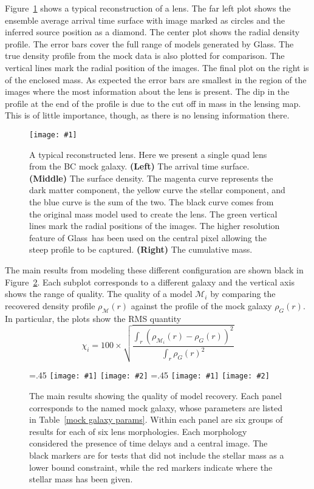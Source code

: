\documentclass[onecolumn,galley]{mn2e}
\newcommand{\Glass}{{\sc Glass}}
\newcommand{\M}{\ensuremath{\mathscr{M}}}
\newcommand{\tabref}[1] {Table~\ref{#1}}
\newcommand{\figref}[1] {Figure~\ref{#1}}
\newcommand\plotone[1]{%
 \centering
 \leavevmode
 \texttt{[image: \#1]}%
}%
\newcommand\plottwo[2]{{%
 \centering
 \leavevmode
 \columnwidth=.45\columnwidth
 \texttt{[image: \#1]}%
 \hfil
 \texttt{[image: \#2]}%
}}%
\begin{document}
\figref{reconstruction} shows a typical reconstruction of a
lens. The far left plot shows the ensemble average arrival time surface with
image marked as circles and the inferred source position as a diamond. The
center plot shows the radial density profile. The error bars cover the full
range of models generated by \Glass. The true density profile from the mock
data is also plotted for comparison. The vertical lines mark the radial
position of the images. The final plot on the right is of the enclosed mass. As
expected the error bars are smallest in the region of the images where the most
information about the lens is present. The dip in the profile at the end of the
profile is due to the cut off in mass in the lensing map. This is of little
importance, though, as there is no lensing information there.

\begin{figure}
\plotone{BCQuadR1a_TmS.pdf}
\caption{A typical reconstructed lens. Here we present a single quad lens from 
the BC mock galaxy.
\textbf{(Left)}
The arrival time surface. 
\textbf{(Middle)}
The surface density. The magenta curve represents the dark matter component,
the yellow curve the stellar component, and the blue curve is the sum of the two.
The black curve comes from the original mass model used to create the lens.
The green vertical lines mark the radial positions of the images. The higher
resolution feature of \Glass\ has been used on the central pixel allowing the
steep profile to be captured.
\textbf{(Right)}
The cumulative mass.}
\label{reconstruction}
\end{figure}

The main results from modeling these different configuration are shown black in
\figref{main results}. Each subplot corresponds to a different galaxy and
the vertical axis shows the range of quality.  The quality of a
model $\M_i$ by comparing the recovered density profile $\rho_\M(r)$ against
the profile of the mock galaxy $\rho_G(r)$.  In particular, the plots show the
RMS quantity
%
\begin{equation}
  \chi_i = 100 \times \sqrt{\frac{\int_r (\rho_{\M_i}(r) - \rho_G(r))^2}{\int_r \rho_G(r)^2}}
\end{equation}
%

\begin{figure}
\plottwo{AAchi2_profile.pdf}{BBchi2_profile.pdf}
\plottwo{ACchi2_profile.pdf}{BCchi2_profile.pdf}
\caption{The main results showing the quality of model recovery. Each panel corresponds to 
the named mock galaxy, whose parameters are listed in \tabref{mock galaxy params}. Within
each panel are six groups of results for each of six lens morphologies. Each morphology
considered the presence of time delays and a central image. The black markers are for tests
that did not include the stellar mass as a lower bound constraint, while the red markers
indicate where the stellar mass has been given.}
\label{main results}
\end{figure}
\end{document}
